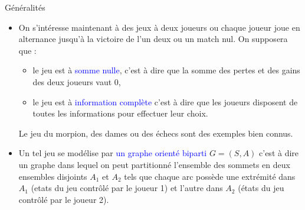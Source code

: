 \documentclass[10pt]{beamer}
\begin{document}
\begin{frame}[fragile]{\Ctitle}{\stitle}
	\begin{block}{Généralités}
		\begin{itemize}
			\item<1-> On s'intéresse maintenant à des jeux à deux joueurs ou chaque joueur joue en alternance jusqu'à la victoire de l'un deux ou un match nul. On supposera que :
			\begin{itemize}
				\item<2-> le jeu est à \textcolor{blue}{somme nulle}, c'est à dire que la somme des pertes et des gains des deux joueurs vaut 0,
				\item<3-> le jeu est à \textcolor{blue}{information complète} c'est à dire que les joueurs disposent de toutes les informations pour effectuer leur choix.
			\end{itemize}
			Le jeu du morpion, des dames ou des échecs sont des exemples bien connus.
			\item<2-> Un tel jeu se modélise par \textcolor{blue}{un graphe orienté biparti} $G = (S, A)$ c'est à dire un graphe dans lequel on peut partitionné l'ensemble des sommets en deux ensembles disjoints  $A_1$ et $A_2$ tels que chaque arc possède une extrémité dans $A_1$ (etats du jeu contrôlé par le joueur 1) et l'autre dans $A_2$ (états du jeu contrôlé par le joueur 2).
		\end{itemize} 
	\end{block}
\end{frame}
\end{document}
